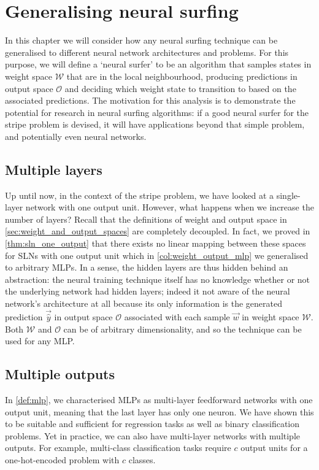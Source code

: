 \chapter{Generalising neural surfing}
In this chapter we will consider how any neural surfing technique can be generalised to different neural network architectures and problems.
For this purpose, we will define a `neural surfer' to be an algorithm that samples states in weight space $\mathcal{W}$ that are in the local neighbourhood, producing predictions in output space $\mathcal{O}$ and deciding which weight state to transition to based on the associated predictions.
The motivation for this analysis is to demonstrate the potential for research in neural surfing algorithms: if a good neural surfer for the stripe problem is devised, it will have applications beyond that simple problem, and potentially even neural networks.

\section{Multiple layers}
Up until now, in the context of the stripe problem, we have looked at a single-layer network with one output unit.
However, what happens when we increase the number of layers?
Recall that the definitions of weight and output space in \ref{sec:weight_and_output_spaces} are completely decoupled. 
In fact, we proved in \ref{thm:sln_one_output} that there exists no linear mapping between these spaces for SLNs with one output unit which in \ref{col:weight_output_mlp} we generalised to arbitrary MLPs. 
In a sense, the hidden layers are thus hidden behind an abstraction: the neural training technique itself has no knowledge whether or not the underlying network had hidden layers; indeed it not aware of the neural network's architecture at all because its only information is the generated prediction $\vec{\hat{y}}$ in output space $\mathcal{O}$ associated with each sample $\vec{w}$ in weight space $\mathcal{W}$.
Both  $\mathcal{W}$ and $\mathcal{O}$ can be of arbitrary dimensionality, and so the technique can be used for any MLP.


\section{Multiple outputs}
In \ref{def:mlp}, we characterised MLPs as multi-layer feedforward networks with one output unit, meaning that the last layer has only one neuron. 
We have shown this to be suitable and sufficient for regression tasks as well as binary classification problems. 
Yet in practice, we can also have multi-layer networks with multiple outputs.
For example, multi-class classification tasks require $c$ output units for a one-hot-encoded problem with $c$ classes.

